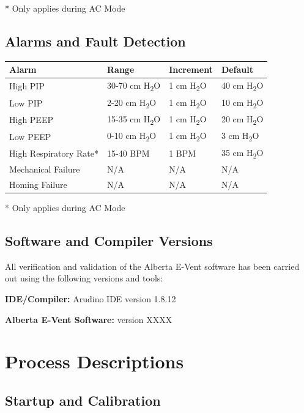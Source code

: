 \documentclass[]{article}
\begin{document}
\noindent ** Only applies during AC Mode

\subsection{Alarms and Fault Detection}
\begin{center}
	\begin{tabular}{ |p{3.8cm}| p{2.2cm}| p{2.2cm}|p{2.2cm}|}
		\hline
		\textbf{Alarm} & \textbf{Range} & \textbf{Increment} & \textbf{Default}\\
		\hline
		High PIP & 30-70 cm H\textsubscript{2}O & 1 cm H\textsubscript{2}O & 40 cm H\textsubscript{2}O\\
		\hline
		Low PIP & 2-20 cm H\textsubscript{2}O & 1 cm H\textsubscript{2}O & 10 cm H\textsubscript{2}O\\
		\hline
		High PEEP & 15-35 cm H\textsubscript{2}O & 1 cm H\textsubscript{2}O &  20 cm H\textsubscript{2}O\\
		\hline
		Low PEEP & 0-10 cm H\textsubscript{2}O & 1 cm H\textsubscript{2}O &  3 cm H\textsubscript{2}O\\
		\hline
		High Respiratory Rate* & 15-40 BPM & 1 BPM & 35 cm H\textsubscript{2}O\\
		\hline
		Mechanical Failure & N/A & N/A & N/A\\
		\hline
		Homing Failure & N/A & N/A & N/A \\
		\hline
	\end{tabular}
	
\end{center}
* Only applies during AC Mode


\subsection{Software and Compiler Versions}
All verification and validation of the Alberta E-Vent software has been carried out using the following versions and tools:

\noindent\textbf{IDE/Compiler:} Arudino IDE version 1.8.12

\noindent\textbf{Alberta E-Vent Software:} version XXXX


\section{Process Descriptions}


\subsection{Startup and Calibration}
\end{document}
